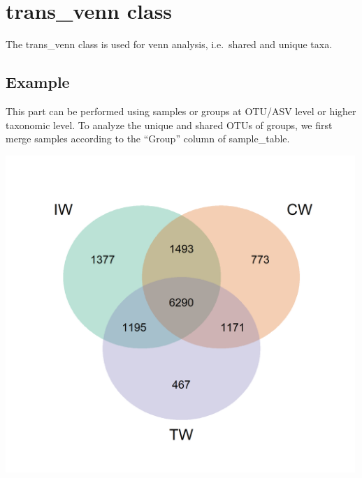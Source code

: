 \documentclass[
]{book}
\newenvironment{Shaded}{\begin{snugshade}}{\end{snugshade}}
\newcommand{\AttributeTok}[1]{\textcolor[rgb]{0.77,0.63,0.00}{#1}}
\newcommand{\CommentTok}[1]{\textcolor[rgb]{0.56,0.35,0.01}{\textit{#1}}}
\newcommand{\ConstantTok}[1]{\textcolor[rgb]{0.00,0.00,0.00}{#1}}
\newcommand{\FunctionTok}[1]{\textcolor[rgb]{0.00,0.00,0.00}{#1}}
\newcommand{\NormalTok}[1]{#1}
\newcommand{\OtherTok}[1]{\textcolor[rgb]{0.56,0.35,0.01}{#1}}
\newcommand{\SpecialCharTok}[1]{\textcolor[rgb]{0.00,0.00,0.00}{#1}}
\newcommand{\StringTok}[1]{\textcolor[rgb]{0.31,0.60,0.02}{#1}}
\begin{document}
\hypertarget{trans_venn-class}{%
\section{trans\_venn class}\label{trans_venn-class}}

The trans\_venn class is used for venn analysis, i.e.~shared and unique taxa.

\hypertarget{example-2}{%
\subsection{Example}\label{example-2}}

This part can be performed using samples or groups at OTU/ASV level or higher taxonomic level.
To analyze the unique and shared OTUs of groups,
we first merge samples according to the ``Group'' column of sample\_table.

\begin{Shaded}
\end{Shaded}

\begin{center}\includegraphics[width=500px]{Images/trans_venn_0} \end{center}
\end{document}
